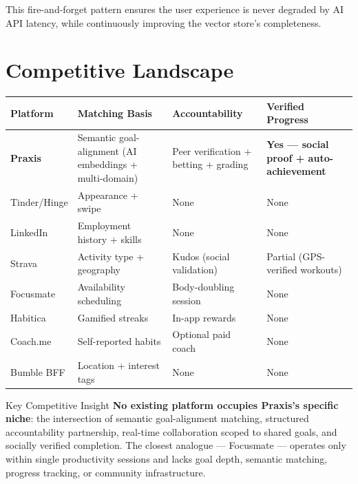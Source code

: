 \documentclass[11pt,a4paper]{article}
\begin{document}
This fire-and-forget pattern ensures the user experience is never degraded by AI API latency, while continuously improving the vector store's completeness.

\section{Competitive Landscape}

\begin{center}
\begin{tabularx}{\linewidth}{lXXX}
\toprule
\textbf{Platform} & \textbf{Matching Basis} & \textbf{Accountability} & \textbf{Verified Progress} \\
\midrule
\textbf{Praxis} & Semantic goal-alignment (AI embeddings + multi-domain) & Peer verification + betting + grading & \textbf{Yes — social proof + auto-achievement} \\
\midrule
Tinder/Hinge & Appearance + swipe & None & None \\
LinkedIn & Employment history + skills & None & None \\
Strava & Activity type + geography & Kudos (social validation) & Partial (GPS-verified workouts) \\
Focusmate & Availability scheduling & Body-doubling session & None \\
Habitica & Gamified streaks & In-app rewards & None \\
Coach.me & Self-reported habits & Optional paid coach & None \\
Bumble BFF & Location + interest tags & None & None \\
\bottomrule
\end{tabularx}
\end{center}

\begin{calloutbox}{Key Competitive Insight}
\textbf{No existing platform occupies Praxis's specific niche}: the intersection of semantic goal-alignment matching, structured accountability partnership, real-time collaboration scoped to shared goals, and socially verified completion. The closest analogue — Focusmate — operates only within single productivity sessions and lacks goal depth, semantic matching, progress tracking, or community infrastructure.
\end{calloutbox}
\end{document}
